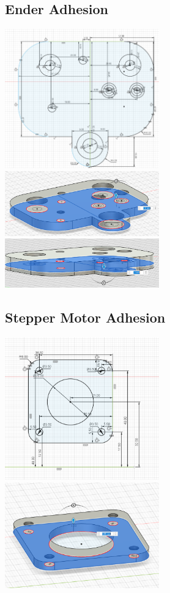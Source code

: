 \subsection{Ender Adhesion} %
\includegraphics[width=0.5\textwidth]{3dprints/extrusion_plate_3.png}
\includegraphics[width=0.5\textwidth]{3dprints/extrusion_plate.png}
\includegraphics[width=0.5\textwidth]{3dprints/extrusion_plate_2.png}

\subsection{Stepper Motor Adhesion}
\includegraphics[width=0.5\textwidth]{3dprints/motor_holder.png}
\includegraphics[width=0.5\textwidth]{3dprints/motor_holder_2.png}
